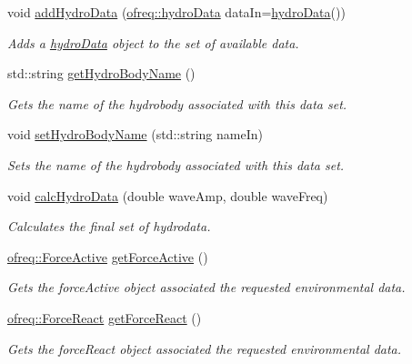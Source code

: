 \begin{DoxyCompactItemize}
void \hyperlink{classosea_1_1ofreq_1_1_hydro_manager_a72f2a82ece47a66bdcaaf7934140d322}{add\-Hydro\-Data} (\hyperlink{classosea_1_1ofreq_1_1hydro_data}{ofreq\-::hydro\-Data} data\-In=\hyperlink{classosea_1_1ofreq_1_1hydro_data}{hydro\-Data}())
\begin{DoxyCompactList}\small\item\em Adds a \hyperlink{classosea_1_1ofreq_1_1hydro_data}{hydro\-Data} object to the set of available data. \end{DoxyCompactList}\item 
std\-::string \hyperlink{classosea_1_1ofreq_1_1_hydro_manager_acd5feac035ac13f9f150a7339cfacde7}{get\-Hydro\-Body\-Name} ()
\begin{DoxyCompactList}\small\item\em Gets the name of the hydrobody associated with this data set. \end{DoxyCompactList}\item 
void \hyperlink{classosea_1_1ofreq_1_1_hydro_manager_a9c8b57356992e0426014f6e4765aab5a}{set\-Hydro\-Body\-Name} (std\-::string name\-In)
\begin{DoxyCompactList}\small\item\em Sets the name of the hydrobody associated with this data set. \end{DoxyCompactList}\item 
void \hyperlink{classosea_1_1ofreq_1_1_hydro_manager_af0af755869433126a4190d3b4eb0aed7}{calc\-Hydro\-Data} (double wave\-Amp, double wave\-Freq)
\begin{DoxyCompactList}\small\item\em Calculates the final set of hydrodata. \end{DoxyCompactList}\item 
\hyperlink{classosea_1_1ofreq_1_1_force_active}{ofreq\-::\-Force\-Active} \hyperlink{classosea_1_1ofreq_1_1_hydro_manager_a29a5ee371b8a0a7107ec28df533850b9}{get\-Force\-Active} ()
\begin{DoxyCompactList}\small\item\em Gets the force\-Active object associated the requested environmental data. \end{DoxyCompactList}\item 
\hyperlink{classosea_1_1ofreq_1_1_force_react}{ofreq\-::\-Force\-React} \hyperlink{classosea_1_1ofreq_1_1_hydro_manager_a72f1dbf1f13e0efc7926e41850127da9}{get\-Force\-React} ()
\begin{DoxyCompactList}\small\item\em Gets the force\-React object associated the requested environmental data. \end{DoxyCompactList}\item 

\end{DoxyCompactItemize}
